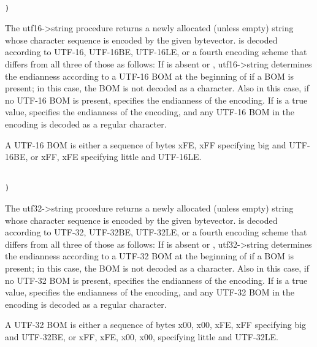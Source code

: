 \begin{entry}{%
}
{\tt\obeyspaces\\
     )}

 The {\cf utf16->string} procedure returns
a newly allocated (unless empty) string whose character sequence is
encoded by the given bytevector.   is decoded according
to UTF-16, UTF-16BE, UTF-16LE, or a fourth encoding scheme that differs from
all three of those as follows: If  is
absent or \schfalse, {\cf utf16->string} determines the endianness
according to a UTF-16 BOM at the beginning of  if a
BOM is present; in this case, the BOM is not decoded as a character.
Also in this case, if no UTF-16 BOM is present, 
specifies the endianness of the encoding.  If
 is a true value, 
specifies the endianness of the encoding, and any UTF-16 BOM in the
encoding is decoded as a regular character.

\begin{note}
  A UTF-16 BOM is either a sequence of bytes \sharpsign{}xFE,
  \sharpsign{}xFF specifying {\cf big} and UTF-16BE, or \sharpsign{}xFF,
  \sharpsign{}xFE specifying {\cf little} and UTF-16LE.
\end{note}
\end{entry}

\begin{entry}{%
}
{\tt\obeyspaces\\
     )}

 The {\cf utf32->string} procedure returns
a newly allocated (unless empty) string whose character sequence is
encoded by the given bytevector.   is decoded according
to UTF-32, UTF-32BE, UTF-32LE, or a fourth encoding scheme that differs from
all three of those as follows: If  is
absent or \schfalse, {\cf utf32->string} determines the endianness
according to a UTF-32 BOM at the beginning of  if a
BOM is present; in this case, the BOM is not decoded as a character.
Also in this case, if no UTF-32 BOM is present, 
specifies the endianness of the encoding.  If
 is a true value, 
specifies the endianness of the encoding, and any UTF-32 BOM in the
encoding is decoded as a regular character.

\begin{note}
  A UTF-32 BOM is either a sequence of bytes \sharpsign{}x00,
  \sharpsign{}x00, \sharpsign{}xFE, \sharpsign{}xFF specifying {\cf
    big} and UTF-32BE, or \sharpsign{}xFF, \sharpsign{}xFE,
  \sharpsign{}x00, \sharpsign{}x00, specifying {\cf little} and
  UTF-32LE.
\end{note}
\end{entry}


